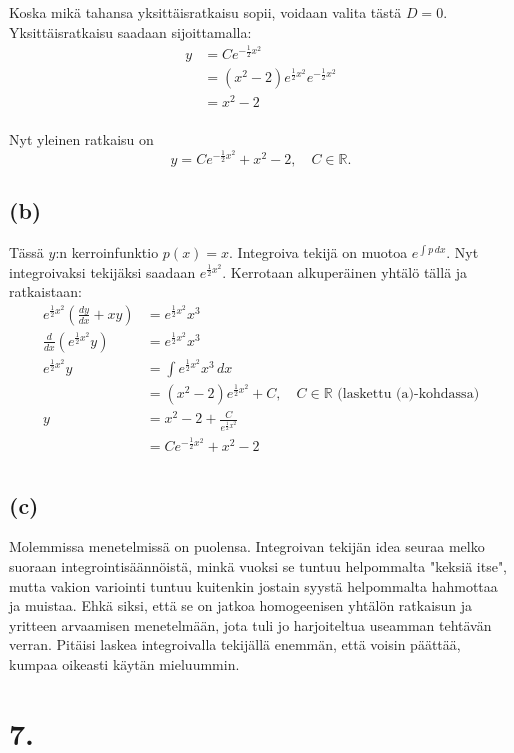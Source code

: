 \documentclass{article}
\begin{document}
Koska mikä tahansa yksittäisratkaisu sopii, voidaan valita tästä $D = 0$.
Yksittäisratkaisu saadaan sijoittamalla:
\begin{align*}
  y &= Ce^{-\frac{1}{2}x^2} \\
    &= (x^2 - 2)e^{\frac{1}{2}x^2}e^{-\frac{1}{2}x^2} \\
    &= x^2 - 2 \\
\end{align*}

Nyt yleinen ratkaisu on
\[
  y = Ce^{-\frac{1}{2}x^2} + x^2 - 2, \quad C \in \mathbb{R}.
\]

\subsection*{(b)}

Tässä $y$:n kerroinfunktio $p(x) = x$.
Integroiva tekijä on muotoa $e^{\int p\,dx}$.
Nyt integroivaksi tekijäksi saadaan $e^{\frac{1}{2}x^2}$.
Kerrotaan alkuperäinen yhtälö tällä ja ratkaistaan:
\begin{align*}
  e^{\frac{1}{2}x^2}(\frac{dy}{dx} + xy) &= e^{\frac{1}{2}x^2}x^3 \\
  \frac{d}{dx}(e^{\frac{1}{2}x^2}y) &= e^{\frac{1}{2}x^2}x^3 \\
  e^{\frac{1}{2}x^2}y &= \int e^{\frac{1}{2}x^2}x^3 \,dx \\
                      &= (x^2 - 2)e^{\frac{1}{2}x^2} + C, \quad C \in \mathbb{R} \text{ (laskettu (a)-kohdassa)} \\
  y &= x^2 - 2 + \frac{C}{e^{\frac{1}{2}x^2}} \\
    &= Ce^{-\frac{1}{2}x^2} + x^2 - 2 \\
\end{align*}

\subsection*{(c)}

Molemmissa menetelmissä on puolensa. Integroivan tekijän idea seuraa melko
suoraan integrointisäännöistä, minkä vuoksi se tuntuu helpommalta "keksiä
itse", mutta vakion variointi tuntuu kuitenkin jostain syystä helpommalta
hahmottaa ja muistaa. Ehkä siksi, että se on jatkoa homogeenisen yhtälön
ratkaisun ja yritteen arvaamisen menetelmään, jota tuli jo harjoiteltua
useamman tehtävän verran. Pitäisi laskea integroivalla tekijällä enemmän,
että voisin päättää, kumpaa oikeasti käytän mieluummin.

\section*{7.}
\end{document}
